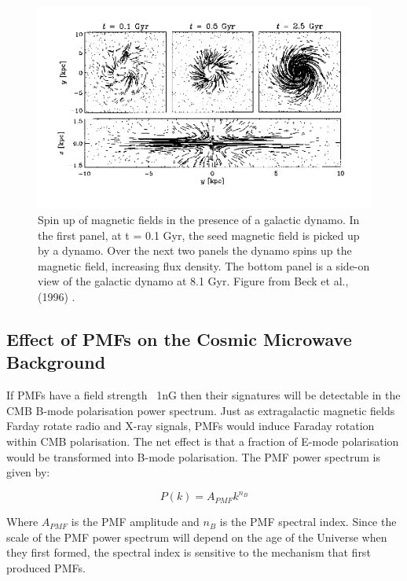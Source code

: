 \begin{figure}[ht]
\centering
\includegraphics[scale=1]{images/dynamos_beck.png}
\caption{Spin up of magnetic fields in the presence of a galactic dynamo. In the first panel, at t = 0.1 Gyr, the seed magnetic field is picked up by a dynamo. Over the next two panels the dynamo spins up the magnetic field, increasing flux density. The bottom panel is a side-on view of the galactic dynamo at 8.1 Gyr. Figure from Beck et al., (1996) \cite{Beck:1996}.}
\end{figure}

\subsection{Effect of PMFs on the Cosmic Microwave Background}
If PMFs have a field strength ~1nG then their signatures will be detectable in the CMB B-mode polarisation power spectrum. Just as extragalactic magnetic fields Farday rotate radio and X-ray signals, PMFs would induce Faraday rotation within CMB polarisation. The net effect is that a fraction of E-mode polarisation would be transformed into B-mode polarisation. 
The PMF power spectrum is given by:

\begin{equation}
\label{eqn:pmfpower}
P(k) = A_{PMF}k^{n_B}
\end{equation}

Where $A_{PMF}$ is the PMF amplitude and $n_{B}$ is the PMF spectral index. Since the scale of the PMF power spectrum will depend on the age of the Universe when they first formed, the spectral index is sensitive to the mechanism that first produced PMFs.

